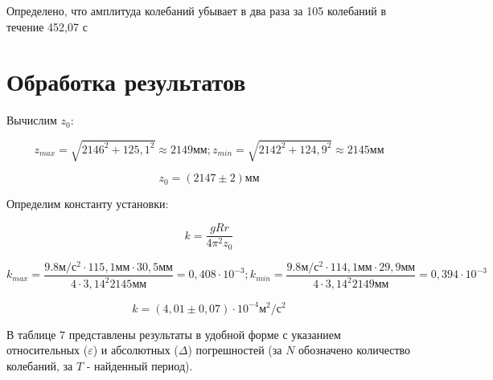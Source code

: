 \documentclass{report}
\begin{document}
	Определено, что амплитуда колебаний убывает в два раза за 105 колебаний в течение 452,07 с
	
	\section*{Обработка результатов}
	
	Вычислим $z_{0}$:
	
	\begin{equation}
		z_{max} = \sqrt{2146^{2} + 125,1^{2}} \approx 2149 мм;
		z_{min} = \sqrt{2142^{2} + 124,9^{2}} \approx 2145 мм
	\end{equation}
	
	\begin{equation}
		\boxed{z_{0} = (2147 \pm 2) мм}
	\end{equation}
	
	Определим константу установки:
	
	\begin{equation}
		k = \dfrac{gRr}{4\pi^{2}z_{0}}
	\end{equation}
	
	\begin{equation}
		k_{max} = \dfrac{9.8 м/с^{2}  \cdot 115,1 мм\cdot 30,5 мм}{4 \cdot 3,14^{2} 2145 мм} = 0,408 \cdot 10^{-3}; 
		k_{min} = \dfrac{9.8 м/с^{2}  \cdot 114,1 мм \cdot 29,9 мм}{4 \cdot 3,14^{2} 2149 мм} = 0,394 \cdot 10^{-3}
	\end{equation}
	
	\begin{equation}
		\boxed{k = (4,01 \pm 0,07) \cdot 10^{-4} м^{2}/с^{2}}
	\end{equation}
	
	В таблице 7 представлены результаты в удобной форме с указанием относительных ($\varepsilon$) и абсолютных ($\Delta$) погрешностей (за $N$ обозначено количество колебаний, за $T$  - найденный период).
	
\end{document}
